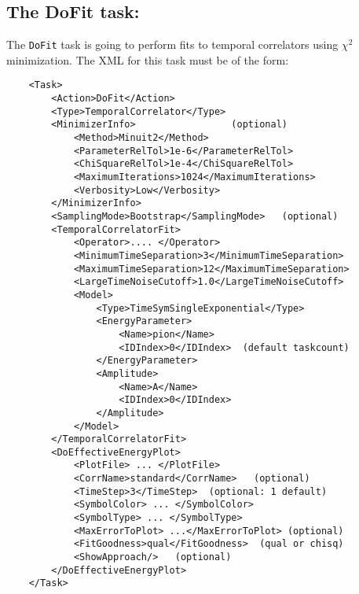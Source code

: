 \documentclass[12pt]{article}
\newcommand{\vb}{\texttt}
\begin{document}
\subsection{The DoFit task:}
The \vb{DoFit} task is going to perform fits to temporal correlators
using $\chi^2$ minimization.
The XML for this task must be of the form:
\begin{verbatim}
    <Task>
        <Action>DoFit</Action>
        <Type>TemporalCorrelator</Type>
        <MinimizerInfo>                 (optional)
            <Method>Minuit2</Method>
            <ParameterRelTol>1e-6</ParameterRelTol>
            <ChiSquareRelTol>1e-4</ChiSquareRelTol>
            <MaximumIterations>1024</MaximumIterations>
            <Verbosity>Low</Verbosity>
        </MinimizerInfo>
        <SamplingMode>Bootstrap</SamplingMode>   (optional)
        <TemporalCorrelatorFit>
            <Operator>.... </Operator>
            <MinimumTimeSeparation>3</MinimumTimeSeparation>
            <MaximumTimeSeparation>12</MaximumTimeSeparation>
            <LargeTimeNoiseCutoff>1.0</LargeTimeNoiseCutoff>
            <Model>
                <Type>TimeSymSingleExponential</Type>
                <EnergyParameter>
                    <Name>pion</Name>
                    <IDIndex>0</IDIndex>  (default taskcount)
                </EnergyParameter>
                <Amplitude>
                    <Name>A</Name>
                    <IDIndex>0</IDIndex>
                </Amplitude>
            </Model>
        </TemporalCorrelatorFit>
        <DoEffectiveEnergyPlot>
            <PlotFile> ... </PlotFile>
            <CorrName>standard</CorrName>   (optional)
            <TimeStep>3</TimeStep>  (optional: 1 default)
            <SymbolColor> ... </SymbolColor>
            <SymbolType> ... </SymbolType>
            <MaxErrorToPlot> ...</MaxErrorToPlot> (optional)
            <FitGoodness>qual</FitGoodness>  (qual or chisq)
            <ShowApproach/>   (optional)
        </DoEffectiveEnergyPlot>
    </Task>
\end{verbatim}
\end{document}

